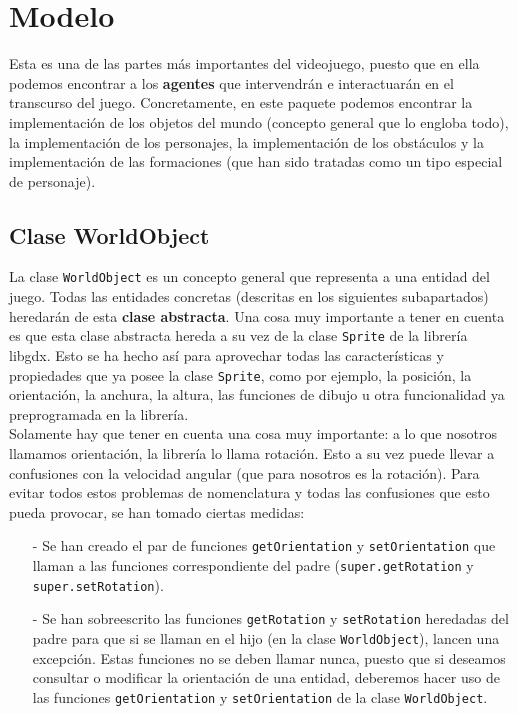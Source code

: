 \medskip
\section{Modelo}

Esta es una de las partes más importantes del videojuego, puesto que en ella podemos encontrar a los \textbf{agentes} que intervendrán e interactuarán en el transcurso del juego. Concretamente, en este paquete podemos encontrar la implementación de los objetos del mundo (concepto general que lo engloba todo), la implementación de los personajes, la implementación de los obstáculos y la implementación de las formaciones (que han sido tratadas como un tipo especial de personaje).

\subsection{Clase WorldObject}

La clase \texttt{WorldObject} es un concepto general que representa a una entidad del juego. Todas las entidades concretas (descritas en los siguientes subapartados) heredarán de esta \textbf{clase abstracta}. Una cosa muy importante a tener en cuenta es que esta clase abstracta hereda a su vez de la clase \texttt{Sprite} de la librería libgdx. Esto se ha hecho así para aprovechar todas las características y propiedades que ya posee la clase \texttt{Sprite}, como por ejemplo, la posición, la orientación, la anchura, la altura, las funciones de dibujo u otra funcionalidad ya preprogramada en la librería. \\

Solamente hay que tener en cuenta una cosa muy importante: a lo que nosotros llamamos orientación, la librería lo llama rotación. Esto a su vez puede llevar a confusiones con la velocidad angular (que para nosotros es la rotación). Para evitar todos estos problemas de nomenclatura y todas las confusiones que esto pueda provocar, se han tomado ciertas medidas:

\begin{itemize}
	\item[-] Se han creado el par de funciones \texttt{getOrientation} y \texttt{setOrientation} que llaman a las funciones correspondiente del padre (\texttt{super.getRotation} y \texttt{super.setRotation}).
	\item[-] Se han sobreescrito las funciones \texttt{getRotation} y \texttt{setRotation} heredadas del padre para que si se llaman en el hijo (en la clase \texttt{WorldObject}), lancen una excepción. Estas funciones no se deben llamar nunca, puesto que si deseamos consultar o modificar la orientación de una entidad, deberemos hacer uso de las funciones \texttt{getOrientation} y \texttt{setOrientation} de la clase \texttt{WorldObject}.
\end{itemize}

